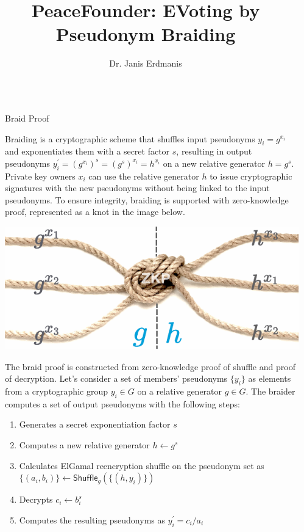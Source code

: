 \documentclass[final]{beamer}
\title{PeaceFounder: EVoting by\\ Pseudonym Braiding}
\author{Dr. Janis Erdmanis}
\institute[shortinst]{janiserdmanis@protonmail.ch}
\newlength{\sepwidth}
\newlength{\colwidth}
\newcommand{\separatorcolumn}{\begin{column}{\sepwidth}\end{column}}
\begin{document}

\begin{frame}[t]
\begin{columns}[t]
\separatorcolumn

\begin{column}{\colwidth}

\vspace{-5cm}
  
\begin{block}{Braid Proof}

Braiding is a cryptographic scheme that shuffles input pseudonyms $y_i = g^{x_i}$ and exponentiates them with a secret factor $s$, resulting in output pseudonyms $y^\prime_i=(g^{x_i})^s = (g^s)^{x_i}=h^{x_i}$ on a new relative generator $h = g^s$. Private key owners $x_i$ can use the relative generator $h$ to issue cryptographic signatures with the new pseudonyms without being linked to the input pseudonyms. To ensure integrity, braiding is supported with zero-knowledge proof, represented as a knot in the image below. 

\begin{center}
  \vspace{-0.5cm}
  \includegraphics[width=0.8\colwidth]{figures/braid.pdf}
  \vspace{-1cm}
\end{center}

The braid proof is constructed from zero-knowledge proof of shuffle and proof of decryption. Let's consider a set of members' pseudonyms $\{y_i\}$ as elements from a cryptographic group $y_i \in G$ on a relative generator $g \in G$. The braider computes a set of output pseudonyms with the following steps: 

\begin{enumerate}
\item Generates a secret exponentiation factor $s$ 
\item Computes a new relative generator $h \leftarrow g^s$ 
\item Calculates ElGamal reencryption shuffle on the pseudonym set as $\{(a_i, b_i)\} \leftarrow \mathsf{Shuffle}_g(\{(h, y_i)\})$
\item Decrypts $c_i \leftarrow b_i^s$
\item Computes the resulting pseudonyms as $y_i^\prime = c_i/a_i$
\end{enumerate}


\end{block}
\end{column}
\end{columns}
\end{frame}
\end{document}
